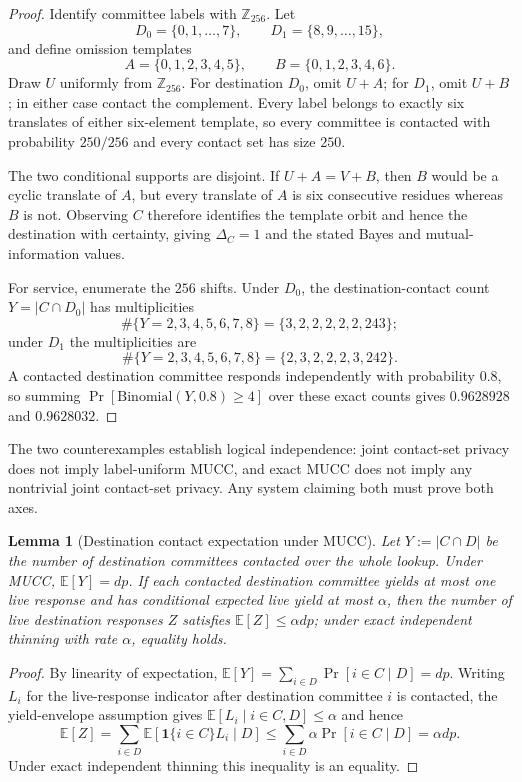 \documentclass[11pt]{article}
\newtheorem{lemma}{Lemma}
\newcommand{\E}{\mathbb{E}}
\newcommand{\one}{\mathbf{1}}
\begin{document}
\begin{proof}
Identify committee labels with $\mathbb Z_{256}$.  Let
\[
D_0=\{0,1,\ldots,7\},\qquad D_1=\{8,9,\ldots,15\},
\]
and define omission templates
\[
A=\{0,1,2,3,4,5\},\qquad B=\{0,1,2,3,4,6\}.
\]
Draw $U$ uniformly from $\mathbb Z_{256}$.  For destination $D_0$, omit $U+A$; for $D_1$, omit $U+B$; in either case contact the complement.  Every label belongs to exactly six translates of either six-element template, so every committee is contacted with probability $250/256$ and every contact set has size $250$.

The two conditional supports are disjoint.  If $U+A=V+B$, then $B$ would be a cyclic translate of $A$, but every translate of $A$ is six consecutive residues whereas $B$ is not.  Observing $C$ therefore identifies the template orbit and hence the destination with certainty, giving $\Delta_C=1$ and the stated Bayes and mutual-information values.

For service, enumerate the $256$ shifts.  Under $D_0$, the destination-contact count $Y=|C\cap D_0|$ has multiplicities
\[
\#\{Y=2,3,4,5,6,7,8\}=\{3,2,2,2,2,2,243\};
\]
under $D_1$ the multiplicities are
\[
\#\{Y=2,3,4,5,6,7,8\}=\{2,3,2,2,2,3,242\}.
\]
A contacted destination committee responds independently with probability $0.8$, so summing $\Pr[\mathrm{Binomial}(Y,0.8)\ge4]$ over these exact counts gives $0.9628928$ and $0.9628032$.
\end{proof}

The two counterexamples establish logical independence: joint contact-set privacy does not imply label-uniform MUCC, and exact MUCC does not imply any nontrivial joint contact-set privacy.  Any system claiming both must prove both axes.

\begin{lemma}[Destination contact expectation under MUCC]
\label{lem:mucc-dest-exp}
Let $Y:=|C\cap D|$ be the number of destination committees contacted over the whole lookup.
Under MUCC, $\E[Y]=dp$.
If each contacted destination committee yields at most one live response and has conditional expected live yield at most $\alpha$, then the number of live destination responses $Z$ satisfies $\E[Z]\le\alpha dp$; under exact independent thinning with rate $\alpha$, equality holds.
\end{lemma}

\begin{proof}
By linearity of expectation, $\E[Y]=\sum_{i\in D}\Pr[i\in C\mid D]=dp$.
Writing $L_i$ for the live-response indicator after destination committee $i$ is contacted, the yield-envelope assumption gives $\E[L_i\mid i\in C,D]\le\alpha$ and hence
\[
\E[Z]=\sum_{i\in D}\E[\one\{i\in C\}L_i\mid D]\le \sum_{i\in D}\alpha\Pr[i\in C\mid D]=\alpha dp.
\]
Under exact independent thinning this inequality is an equality.
\end{proof}
\end{document}
